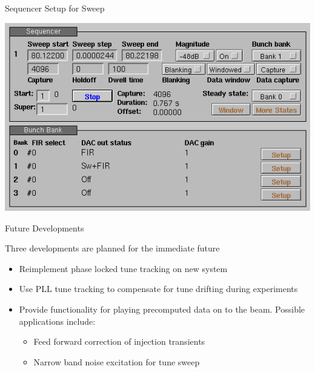 \documentclass[xcolor=table]{beamer}
\begin{document}
%
\begin{frame}{Sequencer Setup for Sweep}

\begin{center}
\includegraphics[width=0.8\linewidth]{control.png}
\end{center}

\end{frame}


%
\begin{frame}{Future Developments}

Three developments are planned for the immediate future

\begin{itemize}
\item Reimplement phase locked tune tracking on new system
\item Use PLL tune tracking to compensate for tune drifting during experiments
\item
    Provide functionality for playing precomputed data on to the beam.  Possible
    applications include:
    \begin{itemize}
    \item Feed forward correction of injection transients
    \item Narrow band noise excitation for tune sweep
    \end{itemize}
\end{itemize}

\end{frame}
\end{document}
